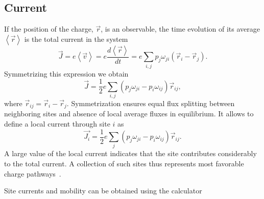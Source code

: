 \subsection{Current}
\label{sec:vaverage}
If the position of the charge, $\vec{r}$, is an observable, the time evolution of its average $\left<\vec{r}\right>$ is the total current in the system
\begin{equation}
 \vec{J} = e \left< \vec{v} \right> = e \frac{d \left< \vec{r}
   \right>} {dt} = e \sum_{i, j} p_{j} \omega_{ji} ( \vec{r}_i -
 \vec{r}_j ) .
\label{equ:current_def}
\end{equation}
Symmetrizing this expression we obtain
\begin{equation}
  \vec{J} = \frac{1}{2} e \sum_{i, j} \left( p_{j} 
  \omega_{ji} - p_{i} \omega_{ij} \right) \vec{r}_{ij} ,
 \label{equ:current}
\end{equation}
where $\vec{r}_{ij} = \vec{r}_{i} - \vec{r}_{j}$. Symmetrization ensures equal flux
splitting between neighboring sites and absence of local average fluxes in equilibrium. It allows to define a local current through site $i$ as
\begin{equation}
  \vec{J_i} = \frac{1}{2} e \sum_{ j} \left( p_{j}  \omega_{ji} - p_{i} \omega_{ij} \right) \vec{r}_{ij} .
 \label{equ:site_current}
\end{equation}
A large value of the local current indicates that the site contributes considerably to the total current. A collection of such sites thus represents most favorable charge pathways~\cite{van_der_holst_modeling_2009}.

Site currents and mobility can be obtained using the  calculator
\vskip 0.2cm
{\noindent \small \ctprun \opt \xmloptions   \sql  \sqlstate \exe {} }


